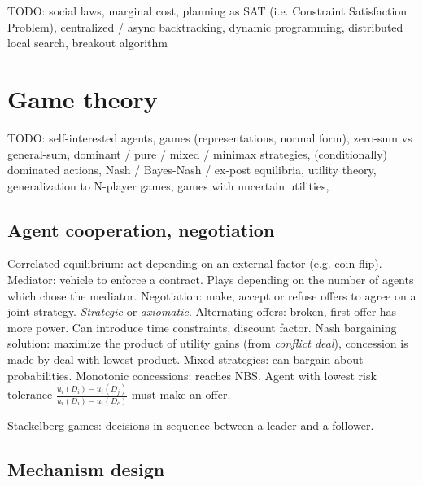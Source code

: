 \documentclass[10pt,a4paper,landscape]{article}
\newcommand{\concept}[1]{\textcolor{Emerald}{#1}} %
\newcommand{\subconcept}[1]{\textit{#1}}
\begin{document}
\begin{multicols*}{4}
TODO: social laws, marginal cost, planning as SAT (i.e. Constraint Satisfaction Problem), centralized / async backtracking, dynamic programming, distributed local search, breakout algorithm

\section{Game theory}

TODO: self-interested agents, games (representations, normal form), zero-sum vs general-sum, dominant / pure / mixed / minimax strategies, (conditionally) dominated actions, Nash / Bayes-Nash / ex-post equilibria, utility theory, generalization to N-player games, games with uncertain utilities,

\subsection{Agent cooperation, negotiation}

\concept{Correlated equilibrium}: act depending on an external factor (e.g. coin flip).
\concept{Mediator}: vehicle to enforce a contract. Plays depending on the number of agents which chose the mediator.
\concept{Negotiation}: make, accept or refuse offers to agree on a joint strategy. \subconcept{Strategic} or \subconcept{axiomatic}.
\concept{Alternating offers}: broken, first offer has more power. Can introduce time constraints, discount factor.
\concept{Nash bargaining solution}: maximize the product of utility gains (from \subconcept{conflict deal}), concession is made by deal with lowest product. Mixed strategies: can bargain about probabilities.
\concept{Monotonic concessions}: reaches NBS. Agent with lowest risk tolerance $\frac{u_i(D_i) - u_i(D_j)}{u_i(D_i) - u_i(D_c)}$ must make an offer.

\concept{Stackelberg games}: decisions in sequence between a leader and a follower.

\subsection{Mechanism design}


\end{multicols*}
\end{document}
